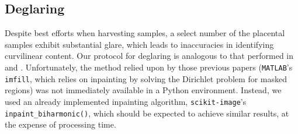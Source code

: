     
%    

    \subsection{Deglaring}
    
    Despite best efforts when harvesting samples, a select number of the placental samples exhibit substantial glare, which leads to inaccuracies in identifying curvilinear content. Our protocol for deglaring is analogous to that performed in \cite{almoussa-ucla-reu} and \cite{huynh2013filter}. Unfortunately, the method relied upon by those previous papers (\texttt{MATLAB}'s \texttt{imfill}, which relies on inpainting by solving the Dirichlet problem for masked regions) was not immediately available in a Python environment. Instead, we used an already implemented inpainting algorithm, \texttt{scikit-image}'s \texttt{inpaint\_biharmonic()}, which should be expected to achieve similar results, at the expense of processing time.
    
